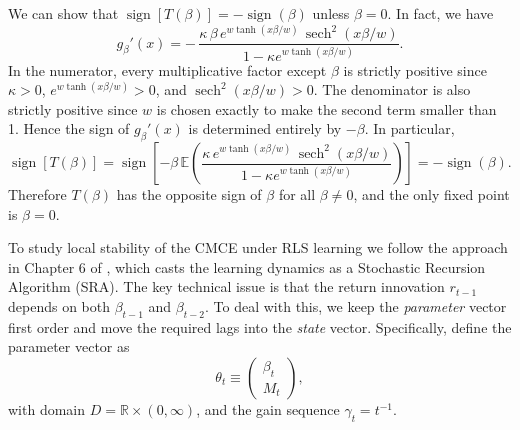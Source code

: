 \documentclass[11pt]{article}
\begin{document}
We can show that  $\operatorname{sign}\left[T(\beta)\right] = - \operatorname{sign}(\beta)$ unless $\beta = 0$. In fact, we have
\begin{equation}
    g_{\beta}'(x)
= -\,\frac{\kappa\,\beta\, e^{w\tanh(x \beta/w)}\, \operatorname{sech}^2(x \beta/w)}
        {1 - \kappa e^{w\tanh(x \beta/w)}}.
\end{equation}
In the numerator, every multiplicative factor except $\beta$ is strictly positive since
$\kappa>0$, $e^{w\tanh(x \beta/w)}>0$, and $\operatorname{sech}^2(x \beta/w)>0$.
The denominator is also strictly positive since $w$ is chosen exactly to make the second term smaller than 1.
Hence the sign of $g_\beta'(x)$ is determined entirely by $-\beta$.
In particular,
\begin{equation}
    \operatorname{sign}\left[T(\beta)\right] 
    = \operatorname{sign}\left[ - \beta \,\mathbb{E}\left(\frac{\kappa\, e^{w\tanh(x \beta/w)}\, \operatorname{sech}^2(x \beta/w)}
        {1 - \kappa e^{w\tanh(x \beta/w)}}\right)\right] = - \operatorname{sign}(\beta).
\end{equation}
Therefore $T(\beta)$ has the opposite sign of $\beta$ for all $\beta \neq 0$, and the only fixed point is $\beta = 0$.

To study local stability of the CMCE under RLS learning we follow the approach in Chapter 6 of \cite{GeorgeWEvans2001},
which casts the learning dynamics as a Stochastic Recursion Algorithm (SRA).
The key technical issue is that the return innovation $r_{t-1}$ depends on both $\beta_{t-1}$ and $\beta_{t-2}$. 
To deal with this, we keep the \emph{parameter} vector first order and move the required lags into the \emph{state} vector. Specifically, define the parameter vector as
\[
\theta_t \equiv 
\begin{pmatrix}
\beta_t\\
M_t
\end{pmatrix},\]
with domain $D=\mathbb R\times (0,\infty)$, and the gain sequence $\gamma_t=t^{-1}$.
\end{document}
